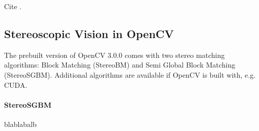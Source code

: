 Cite \cite{einstein}.

\subsection{Stereoscopic Vision in OpenCV}

The prebuilt version of OpenCV 3.0.0 comes with two stereo matching algorithms: Block Matching (StereoBM) and Semi Global Block Matching (StereoSGBM). Additional algorithms are available if OpenCV is built with, e.g. CUDA.

\paragraph{StereoSGBM}\cite{hirschmullerstereo}
blablabalb
